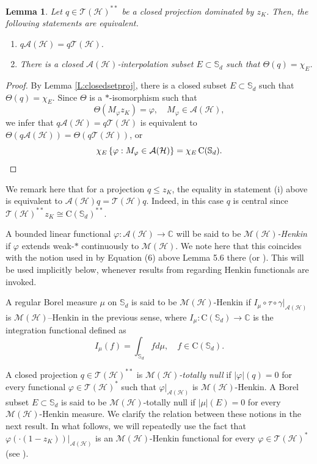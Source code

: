 \documentclass[10pt]{amsart}
\newcommand{\bC}{{\mathbb{C}}}
\newcommand{\bS}{{\mathbb{S}}}
\newcommand{\A}{{\mathcal{A}}}
\renewcommand{\H}{{\mathcal{H}}}
\newcommand{\M}{{\mathcal{M}}}
\newcommand{\T}{{\mathcal{T}}}
\newcommand{\rC}{\mathrm{C}}
\renewcommand{\phi}{\varphi}
\newtheorem{lemma}{Lemma}[section]
\theoremstyle{definition}
\begin{document}
\begin{lemma}\label{L:interpset}
Let $q\in \T(\H)^{**}$ be a closed projection dominated by $z_K$. Then, the following statements are equivalent.
\begin{enumerate}[{\rm (i)}]
\item %
$q\A(\H)=q\T(\H)$.
\item There is a closed $\A(\H)$-interpolation subset $E\subset \bS_d$ such that $\Theta(q)=\chi_E$.
\end{enumerate}
\end{lemma}
\begin{proof}
By Lemma \ref{L:closedsetproj}, there is a closed  subset $E\subset \bS_d$ such that $\Theta(q)=\chi_E$.
Since $\Theta$ is a $*$-isomorphism such that
\[
\Theta(M_\phi z_K)=\phi, \quad M_\phi\in \A(\H),
\]
we infer that $q\A(\H)=q\T(\H)$ is equivalent to $\Theta(q\A(\H))=\Theta(q\T(\H))$, or
\[
\chi_E \, \{\phi:M_\phi\in \A(\H)\} =\chi_E \, \rC(\bS_d) .\qedhere
\] 
\end{proof}


We remark here that for a projection $q\leq z_K$, the equality in statement (i) above is equivalent to $\A(\H)q=\T(\H)q$. Indeed, in this case $q$ is central since $\T(\H)^{**}z_K\cong \rC(\bS_d)^{**}$. 



A bounded linear functional $\phi:\A(\H)\to\bC$ will be said to be \emph{$\M(\H)$-Henkin} if $\phi$ extends weak-$*$ continuously to $\M(\H)$. 
We note here that this coincides with the notion used in \cite{CT2023Henkin} 
by Equation (6) above Lemma 5.6 there
(or  \cite[Lemma 2.1]{DH2023}). This will be used implicitly below, whenever results from \cite{CT2023Henkin} regarding Henkin functionals are invoked.


A regular Borel measure $\mu$ on $\bS_d$ is said to be $\M(\H)$-Henkin if $I_\mu\circ \tau\circ \gamma|_{\A(\H)}$ is $\M(\H)$--Henkin in the previous sense, where $I_\mu:\rC(\bS_d)\to\bC$ is the integration functional defined as
\[
I_\mu(f)= \int_{\bS_d}fd\mu, \quad f\in \rC(\bS_d).
\] 



A closed projection $q\in \T(\H)^{**}$ is \emph{$\M(\H)$-totally null} if $|\phi|(q)=0$ for every functional $\phi\in \T(\H)^*$ such that $\phi|_{\A(\H)}$ is $\M(\H)$-Henkin. A Borel subset $E\subset \bS_d$ is said to be $\M(\H)$-totally null if $|\mu|(E)=0$ for every
 $\M(\H)$-Henkin measure. We clarify the relation between these notions in the next result. In what follows, we will repeatedly use the fact that $\phi(\cdot (1-z_K))|_{\A(\H)}$ is an $\M(\H)$-Henkin functional for every $\phi\in \T(\H)^*$ (see \cite[Lemma 5.5]{CT2023Henkin}).
\end{document}
